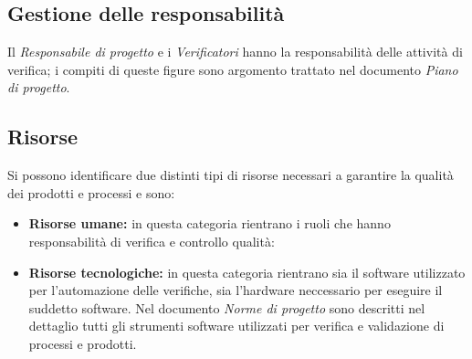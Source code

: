   \subsection{Gestione delle responsabilità}
    Il \emph{Responsabile di progetto} e i \emph{Verificatori} hanno la responsabilità delle attività di verifica;
    i compiti di queste figure sono argomento trattato nel documento \emph{Piano di progetto}.

  \subsection{Risorse}
    Si possono identificare due distinti tipi di risorse necessari a garantire la qualità dei prodotti e processi e sono:
    \begin{itemize}
      \item \textbf{Risorse umane:} in questa categoria rientrano i ruoli che hanno responsabilità di verifica e controllo qualità:
      \item \textbf{Risorse tecnologiche:} in questa categoria rientrano sia il software utilizzato per l'automazione delle verifiche,
      sia l'hardware neccessario per eseguire il suddetto software. Nel documento \emph{Norme di progetto} sono descritti nel dettaglio
      tutti gli strumenti software utilizzati per verifica e validazione di processi e prodotti.
    \end{itemize}
